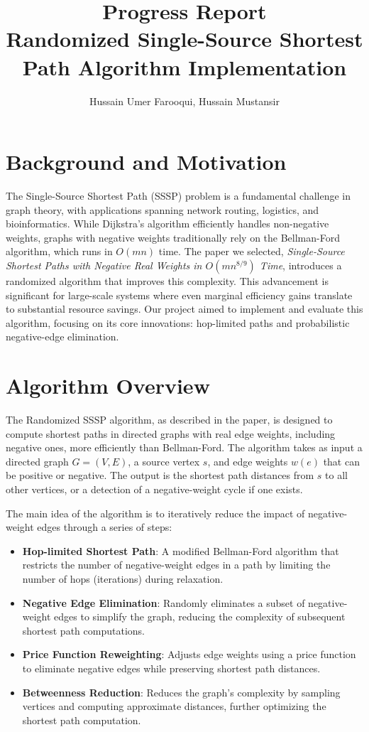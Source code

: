 \documentclass[12pt]{article}
\title{Progress Report \\
Randomized Single-Source Shortest Path Algorithm Implementation}
\author{Hussain Umer Farooqui, Hussain Mustansir}
\begin{document}
\maketitle

\section{Background and Motivation}
The Single-Source Shortest Path (SSSP) problem is a fundamental challenge in graph theory, with applications spanning network routing, logistics, and bioinformatics. While Dijkstra's algorithm efficiently handles non-negative weights, graphs with negative weights traditionally rely on the Bellman-Ford algorithm, which runs in \(O(mn)\) time. The paper we selected, \textit{Single-Source Shortest Paths with Negative Real Weights in \(O(mn^{8/9})\) Time}, introduces a randomized algorithm that improves this complexity. This advancement is significant for large-scale systems where even marginal efficiency gains translate to substantial resource savings. Our project aimed to implement and evaluate this algorithm, focusing on its core innovations: hop-limited paths and probabilistic negative-edge elimination.

\section{Algorithm Overview}
The Randomized SSSP algorithm, as described in the paper, is designed to compute shortest paths in directed graphs with real edge weights, including negative ones, more efficiently than Bellman-Ford. The algorithm takes as input a directed graph $G = (V, E)$, a source vertex $s$, and edge weights $w(e)$ that can be positive or negative. The output is the shortest path distances from $s$ to all other vertices, or a detection of a negative-weight cycle if one exists.

The main idea of the algorithm is to iteratively reduce the impact of negative-weight edges through a series of steps:
\begin{itemize}
    \item \textbf{Hop-limited Shortest Path}: A modified Bellman-Ford algorithm that restricts the number of negative-weight edges in a path by limiting the number of hops (iterations) during relaxation.
    \item \textbf{Negative Edge Elimination}: Randomly eliminates a subset of negative-weight edges to simplify the graph, reducing the complexity of subsequent shortest path computations.
    \item \textbf{Price Function Reweighting}: Adjusts edge weights using a price function to eliminate negative edges while preserving shortest path distances.
    \item \textbf{Betweenness Reduction}: Reduces the graph’s complexity by sampling vertices and computing approximate distances, further optimizing the shortest path computation.
\end{itemize}
\end{document}
